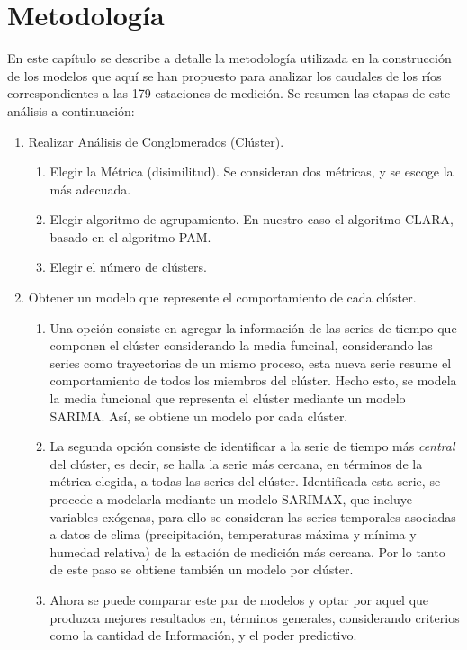 \documentclass[12pt,oneside]{book}\usepackage[]{graphicx}\usepackage[]{color}
\theoremstyle{definition} %
\begin{document}

\chapter{Metodología} \label{cap2}


En este capítulo se describe a detalle la metodología utilizada en la construcción de los modelos que aquí se han propuesto para analizar los caudales de los ríos correspondientes a las 179 estaciones de medición. Se resumen las etapas de este análisis a continuación:

\begin{enumerate}

\item Realizar Análisis de Conglomerados (Clúster).
\begin{enumerate}
\item Elegir la Métrica (disimilitud). Se consideran dos métricas, y se escoge la más adecuada.
\item Elegir algoritmo de agrupamiento. En nuestro caso el algoritmo CLARA, basado en el algoritmo PAM.
\item Elegir el número de clústers.
\end{enumerate}

\item Obtener un modelo que represente el comportamiento de cada clúster.

\begin{enumerate}
\item Una opción consiste en agregar la información de las series de tiempo que componen el clúster considerando la media funcinal, considerando las series como trayectorias de un mismo proceso, esta nueva serie resume el comportamiento de todos los miembros del clúster. Hecho esto, se modela la media funcional que representa el clúster mediante un modelo SARIMA. Así, se obtiene un modelo por cada clúster.
\item La segunda opción consiste de identificar a la serie de tiempo más \textit{central} del clúster, es decir, se halla la serie más cercana, en términos de la métrica elegida, a todas las series del clúster. Identificada esta serie, se procede a modelarla mediante un modelo SARIMAX, que incluye variables exógenas, para ello se consideran las series temporales asociadas a datos de clima (precipitación, temperaturas máxima y mínima y humedad relativa) de la estación de medición más cercana. Por lo tanto de este paso se obtiene también un modelo por clúster.
\item Ahora se puede comparar este par de modelos y optar por aquel que produzca mejores resultados en, términos generales, considerando criterios como la cantidad de Información, y el poder predictivo.


\end{enumerate}
\end{enumerate}
\end{document}
